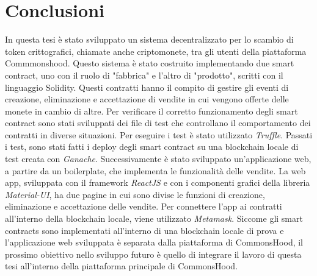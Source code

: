 \documentclass[a4paper]{article}
\begin{document}
        \newpage
        \section{Conclusioni}
        In questa tesi è stato sviluppato un sistema decentralizzato per lo scambio di token crittografici, chiamate anche criptomonete, tra gli utenti della piattaforma Commmonshood. Questo sistema è stato costruito implementando
        due smart contract, uno con il ruolo di "fabbrica" e l'altro di "prodotto", scritti con il linguaggio Solidity. Questi contratti hanno il compito di gestire gli eventi di creazione, eliminazione e accettazione di vendite in cui vengono offerte delle monete in cambio di altre.
        Per verificare il corretto funzionamento degli smart contract sono stati sviluppati dei file di test che controllano il comportamento dei contratti in diverse situazioni. Per eseguire i test è stato utilizzato \emph{Truffle}. Passati i test, sono stati fatti i deploy degli smart contract
        su una blockchain locale di test creata con \emph{Ganache}.
        Successivamente è stato sviluppato un'applicazione web, a partire da un boilerplate, che implementa le funzionalità delle vendite. La web app, sviluppata con il framework \emph{ReactJS} e con i componenti grafici della libreria \emph{Material-UI}, ha due pagine in cui sono divise le funzioni
        di creazione, eliminazione e accettazione delle vendite. Per connettere l'app ai contratti all'interno della blockchain locale, viene utilizzato \emph{Metamask}. Siccome gli smart contracts sono implementati all'interno di una blockchain locale di prova e l'applicazione web sviluppata è separata dalla
        piattaforma di CommonsHood, il prossimo obiettivo nello sviluppo futuro è quello di integrare il lavoro di questa tesi all'interno della piattaforma principale di CommonsHood.
        \newpage
        \printbibliography
\end{document}
